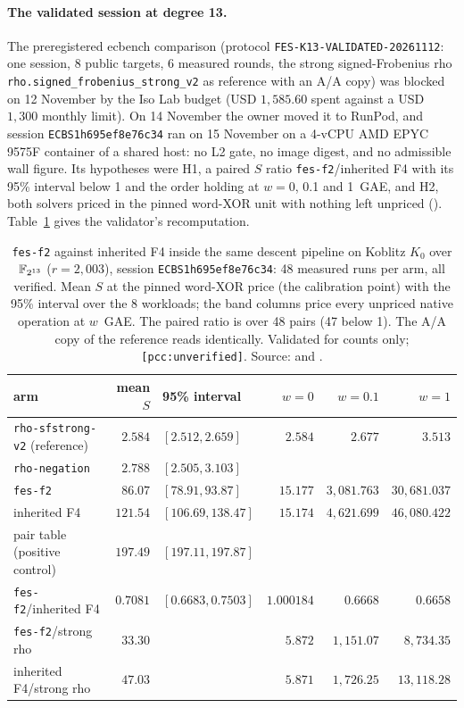 \paragraph{The validated session at degree 13.} The preregistered
ecbench comparison (protocol \texttt{FES-K13-VALIDATED-20261112}: one
session, 8 public targets, 6 measured rounds, the strong signed-Frobenius
rho \texttt{rho.signed\_frobenius\_strong\_v2} as reference with an A/A
copy) was blocked on 12 November by the Iso Lab budget (USD $1{,}585.60$
spent against a USD $1{,}300$ monthly limit). On 14 November the owner moved
it to RunPod, and session \texttt{ECBS1h695ef8e76c34} ran on 15 November on a
4-vCPU AMD EPYC 9575F container of a shared host: no L2 gate, no image
digest, and no admissible wall figure. Its hypotheses were H1, a paired
$S$ ratio \texttt{fes-f2}/inherited F4 with its 95\% interval below 1 and
the order holding at $w=0$, 0.1 and 1~GAE, and H2, both solvers priced in
the pinned word-XOR unit with nothing left unpriced
().
Table~\ref{tab:bo-fesk13} gives the validator's recomputation.

\begin{table}[t]
\centering\small
\begin{tabular}{@{}lrlrrr@{}}
\toprule
arm & mean $S$ & 95\% interval & $w=0$ & $w=0.1$ & $w=1$ \\
\midrule
\texttt{rho-sfstrong-v2} (reference) & $2.584$ & $[2.512,2.659]$ & $2.584$ & $2.677$ & $3.513$ \\
\texttt{rho-negation} & $2.788$ & $[2.505,3.103]$ & & & \\
\texttt{fes-f2} & $86.07$ & $[78.91,93.87]$ & $15.177$ & $3{,}081.763$ & $30{,}681.037$ \\
inherited F4 & $121.54$ & $[106.69,138.47]$ & $15.174$ & $4{,}621.699$ & $46{,}080.422$ \\
pair table (positive control) & $197.49$ & $[197.11,197.87]$ & & & \\
\addlinespace
\texttt{fes-f2}/inherited F4 & $0.7081$ & $[0.6683,0.7503]$ & $1.000184$ & $0.6668$ & $0.6658$ \\
\texttt{fes-f2}/strong rho & $33.30$ & & $5.872$ & $1{,}151.07$ & $8{,}734.35$ \\
inherited F4/strong rho & $47.03$ & & $5.871$ & $1{,}726.25$ & $13{,}118.28$ \\
\bottomrule
\end{tabular}
\caption[]{\texttt{fes-f2} against inherited F4 inside the same descent
pipeline on Koblitz $K_0$ over $\mathbb{F}_{2^{13}}$ ($r=2{,}003$), session
\texttt{ECBS1h695ef8e76c34}: 48 measured runs per arm, all verified. Mean
$S$ at the pinned word-XOR price (the calibration point) with the 95\%
interval over the 8 workloads; the band columns price every unpriced native
operation at $w$~GAE. The paired ratio is over 48 pairs (47 below 1). The
A/A copy of the reference reads identically. Validated for counts only;
\texttt{[pcc:unverified]}. Source:
 and
.}
\label{tab:bo-fesk13}
\end{table}

